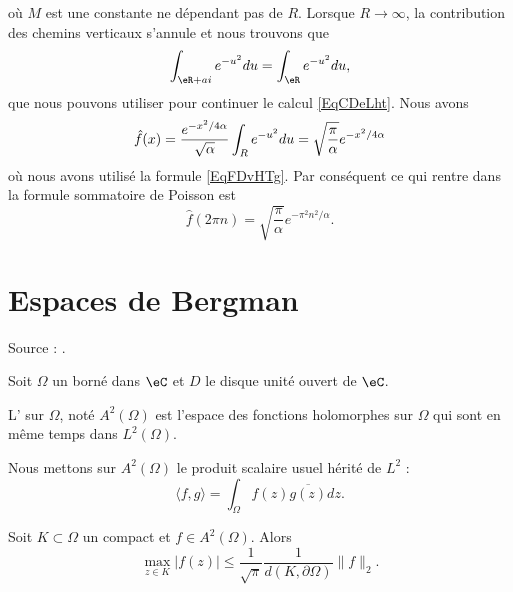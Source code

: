 \begin{example}
\begin{equation}
    \end{equation}
    où \( M\) est une constante ne dépendant pas de \( R\). Lorsque \( R\to \infty\), la contribution des chemins verticaux s'annule et nous trouvons que
    \begin{equation}    \label{EqjrNxLr}
        \int_{\eR+ai} e^{-u^2}du=\int_{\eR} e^{-u^2}du,
    \end{equation}
    que nous pouvons utiliser pour continuer le calcul \eqref{EqCDeLht}. Nous avons
    \begin{equation}
        \hat f(x)= \frac{ e^{-x^2/4\alpha}}{\sqrt{\alpha}}\int_{R} e^{-u^2}du\\
            =\sqrt{\frac{ \pi }{ \alpha }} e^{-x^2/4\alpha}
    \end{equation}
    où nous avons utilisé la formule \eqref{EqFDvHTg}. Par conséquent ce qui rentre dans la formule sommatoire de Poisson est
    \begin{equation}
        \hat f(2\pi n)=\sqrt{\frac{ \pi }{ \alpha }} e^{-\pi^2 n^2/\alpha}.
    \end{equation}
\end{example}


\section{Espaces de Bergman}

Source : \cite{ytMOpe}.

Soit \( \Omega\) un borné dans \( \eC\) et \( D\) le disque unité ouvert de \( \eC\).

\begin{definition}
    L' sur \( \Omega\), noté \( A^2(\Omega)\) est l'espace des fonctions holomorphes sur \( \Omega\) qui sont en même temps dans \( L^2(\Omega)\).
\end{definition}
Nous mettons sur \( A^2(\Omega)\) le produit scalaire usuel hérité de \( L^2\) :
\begin{equation}
    \langle f, g\rangle =\int_{\Omega}f(z)\overline{ g(z) }dz.
\end{equation}

\begin{lemma}   \label{LemIZxKfB}
    Soit \( K\subset \Omega\) un compact et \( f\in A^2(\Omega)\). Alors
    \begin{equation}
        \max_{z\in K}| f(z) |\leq \frac{1}{ \sqrt{\pi} }\frac{1}{ d(K,\partial \Omega) }\| f \|_2.
    \end{equation}
\end{lemma}

